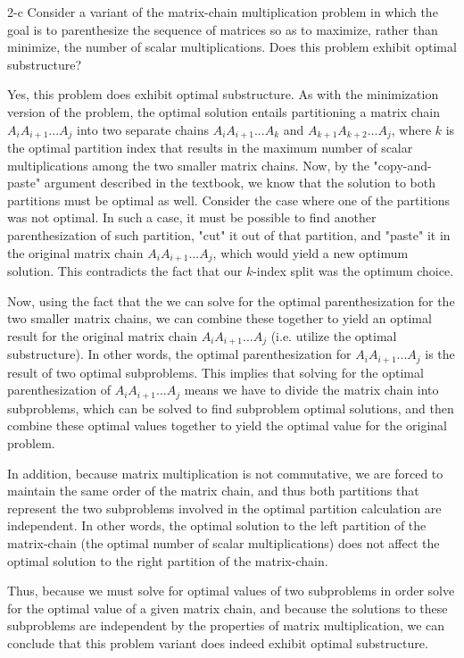 \documentclass[11pt]{article}
\begin{document}
\begin{prob}{2-c}
Consider a variant of the matrix-chain multiplication problem in which the goal is to parenthesize the sequence of matrices so as to maximize, rather than minimize, the number of scalar multiplications. Does this problem exhibit optimal substructure?
\end{prob}
\begin{sol}
Yes, this problem does exhibit optimal substructure. As with the minimization version of the problem, the optimal solution entails partitioning a matrix chain $A_{i}A_{i+1}...A_{j}$ into two separate chains $A_iA_{i+1}...A_k$ and $A_{k+1}A_{k+2}...A_{j}$, where $k$ is the optimal partition index that results in the maximum number of scalar multiplications among the two smaller matrix chains. Now, by the "copy-and-paste" argument described in the textbook, we know that the solution to both partitions must be optimal as well. Consider the case where one of the partitions was not optimal. In such a case, it must be possible to find another parenthesization of such partition, "cut" it out of that partition, and "paste" it in the original matrix chain $A_{i}A_{i+1}...A_{j}$, which would yield a new optimum solution. This contradicts the fact that our $k$-index split was the optimum choice. 

Now, using the fact that the we can solve for the optimal parenthesization for the two smaller matrix chains, we can combine these together to yield an optimal result for the original matrix chain $A_{i}A_{i+1}...A_{j}$ (i.e. utilize the optimal substructure). In other words, the optimal parenthesization for $A_{i}A_{i+1}...A_{j}$ is the result of two optimal subproblems. This implies that solving for the optimal parenthesization of $A_{i}A_{i+1}...A_{j}$ means we have to divide the matrix chain into subproblems, which can be solved to find subproblem optimal solutions, and then combine these optimal values together to yield the optimal value for the original problem. 

In addition, because matrix multiplication is not commutative, we are forced to maintain the same order of the matrix chain, and thus both partitions that represent the two subproblems involved in the optimal partition calculation are independent. In other words, the optimal solution to the left partition of the matrix-chain (the optimal number of scalar multiplications) does not affect the optimal solution to the right partition of the matrix-chain. 

Thus, because we must solve for optimal values of two subproblems in order solve for the optimal value of a given matrix chain, and because the solutions to these subproblems are independent by the properties of matrix multiplication, we can conclude that this problem variant does indeed exhibit optimal substructure.
\end{sol}
\end{document}
